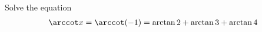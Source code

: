 Solve the equation 
\begin{align*}
\arccot x = \arccot (-1) = \arctan 2 + \arctan 3 + \arctan 4
\end{align*}
